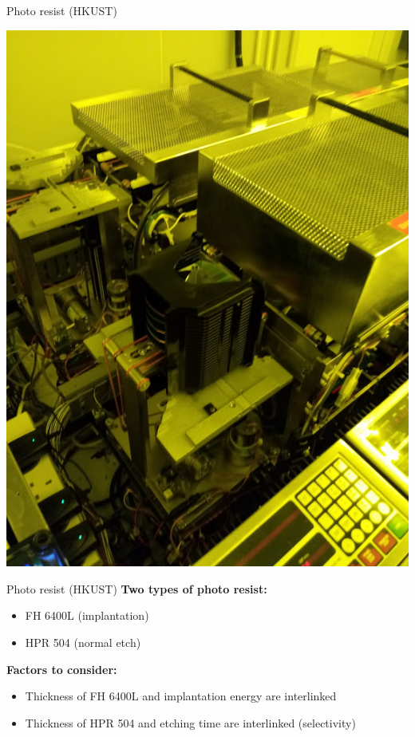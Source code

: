 \documentclass[aspectratio=169]{beamer}
\begin{document}
\begin{frame}{Photo resist (HKUST)}
\begin{center}
\includegraphics[height=0.8\textheight]{images/20181128_154911.jpg}
\end{center}
\end{frame}

\begin{frame}{Photo resist (HKUST)}
	\textbf{Two types of photo resist:}
	\begin{itemize}
		\item FH 6400L (implantation)
		\item HPR 504 (normal etch)
	\end{itemize}

	\textbf{Factors to consider:}
	\begin{itemize}
		\item Thickness of FH 6400L and implantation energy are interlinked
		\item Thickness of HPR 504 and etching time are interlinked (selectivity)
	\end{itemize}
\end{frame}
\end{document}
